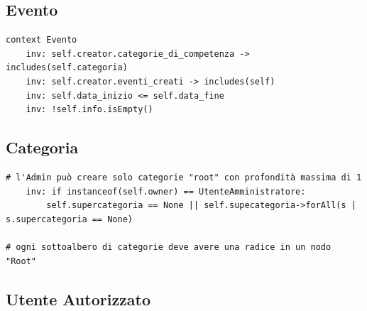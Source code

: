 \documentclass{article}
\begin{document}
\subsection{Evento}

\begin{verbatim}
context Evento
    inv: self.creator.categorie_di_competenza -> includes(self.categoria)
    inv: self.creator.eventi_creati -> includes(self)
    inv: self.data_inizio <= self.data_fine
    inv: !self.info.isEmpty()
\end{verbatim}

\subsection{Categoria}

\begin{verbatim}
# l'Admin può creare solo categorie "root" con profondità massima di 1
    inv: if instanceof(self.owner) == UtenteAmministratore:
        self.supercategoria == None || self.supecategoria->forAll(s | s.supercategoria == None)

# ogni sottoalbero di categorie deve avere una radice in un nodo "Root"
\end{verbatim}

\clearpage

\subsection{Utente Autorizzato}
\end{document}
